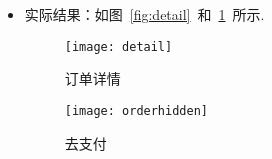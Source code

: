 \begin{enumerate}
\begin{itemize}
              \item {实际结果}：如图~\ref{fig:detail}~和~\ref{fig:orderhidden}~所示.
                    \begin{figure}[htbp]
                        \centering
                        \begin{minipage}{0.35\textwidth}
                            \centering
                            \texttt{[image: detail]}
                            \caption{订单详情}\label{fig:detail}
                        \end{minipage}
                        \begin{minipage}{0.35\textwidth}
                            \centering
                            \texttt{[image: orderhidden]}
                            \caption{去支付}\label{fig:orderhidden}
                        \end{minipage}
                        \vspace{\baselineskip}
                    \end{figure}
          \end{itemize}


\end{enumerate}
